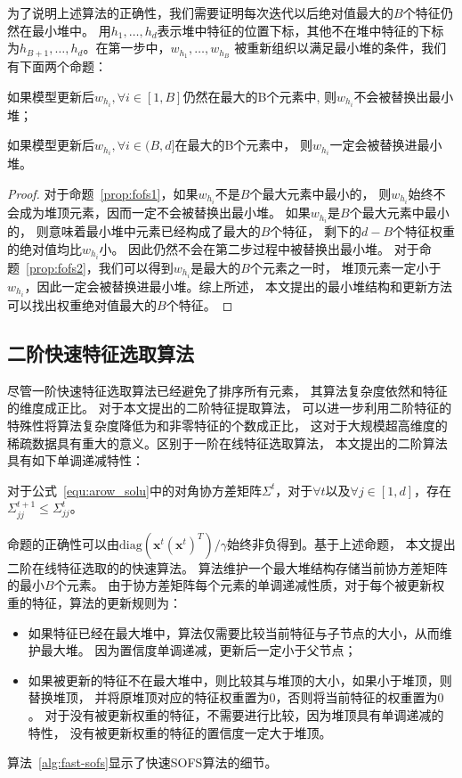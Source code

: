 \documentclass[doctor]{ustcthesis}
\def \x {\mathbf{x}}
\def \diag{\mathrm{diag}}
\begin{document}
为了说明上述算法的正确性，我们需要证明每次迭代以后绝对值最大的$B$个特征仍然在最小堆中。
用$h_1,\ldots, h_d$表示堆中特征的位置下标，其他不在堆中特征的下标为$h_{B+1},
\ldots, h_d$。在第一步中，$w_{h_1},\ldots, w_{h_B}$
被重新组织以满足最小堆的条件，我们有下面两个命题：
\begin{proposition}\label{prop:fofs1}
    如果模型更新后$w_{h_i}, \forall i \in [1,B]$仍然在最大的B个元素中,
    则$w_{h_i}$不会被替换出最小堆；
\end{proposition}
\begin{proposition}\label{prop:fofs2}
    如果模型更新后$w_{h_i}, \forall i \in (B,d]$在最大的B个元素中，
    则$w_{h_i}$一定会被替换进最小堆。
\end{proposition}
\begin{proof}
    对于命题~\ref{prop:fofs1}，如果$w_{h_i}$不是$B$个最大元素中最小的，
    则$w_{h_i}$始终不会成为堆顶元素，因而一定不会被替换出最小堆。
    如果$w_{h_i}$是$B$个最大元素中最小的，
    则意味着最小堆中元素已经构成了最大的$B$个特征，
    剩下的$d-B$个特征权重的绝对值均比$w_{h_i}$小。
    因此仍然不会在第二步过程中被替换出最小堆。
    对于命题~\ref{prop:fofs2}，我们可以得到$w_{h_i}$是最大的$B$个元素之一时，
    堆顶元素一定小于$w_{h_i}$，因此一定会被替换进最小堆。综上所述，
    本文提出的最小堆结构和更新方法可以找出权重绝对值最大的$B$个特征。
\end{proof}

\subsection{二阶快速特征选取算法}
尽管一阶快速特征选取算法已经避免了排序所有元素，
其算法复杂度依然和特征的维度成正比。
对于本文提出的二阶特征提取算法，
可以进一步利用二阶特征的特殊性将算法复杂度降低为和非零特征的个数成正比，
这对于大规模超高维度的稀疏数据具有重大的意义。区别于一阶在线特征选取算法，
本文提出的二阶算法具有如下单调递减特性：

\begin{proposition}[单调递减性]\label{prop:sofs}
    对于公式~\eqref{equ:arow_solu}中的对角协方差矩阵$\Sigma^t$，对于$\forall t$以及$\forall
    j\in[1,d]$，存在$\Sigma_{jj}^{t+1} \leq \Sigma_{jj}^t$。
\end{proposition}

命题的正确性可以由$\diag{(\x^t(\x^t)^T)}/\gamma$始终非负得到。基于上述命题，
本文提出二阶在线特征选取的的快速算法。
算法维护一个最大堆结构存储当前协方差矩阵的最小$B$个元素。
由于协方差矩阵每个元素的单调递减性质，对于每个被更新权重的特征，算法的更新规则为：
\begin{itemize}
    \item 如果特征已经在最大堆中，算法仅需要比较当前特征与子节点的大小，从而维护最大堆。
        因为置信度单调递减，更新后一定小于父节点；
    \item 如果被更新的特征不在最大堆中，则比较其与堆顶的大小，如果小于堆顶，则替换堆顶，
        并将原堆顶对应的特征权重置为$0$，否则将当前特征的权重置为$0$。
        对于没有被更新权重的特征，不需要进行比较，因为堆顶具有单调递减的特性，
        没有被更新权重的特征的置信度一定大于堆顶。
\end{itemize}
算法~\ref{alg:fast-sofs}显示了快速SOFS算法的细节。
\end{document}
